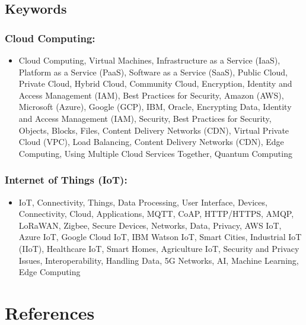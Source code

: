 \documentclass[
  letterpaper,
  DIV=11,
  numbers=noendperiod]{scrreprt}
\providecommand{\tightlist}{%
  \setlength{\itemsep}{0pt}\setlength{\parskip}{0pt}}\usepackage{longtable,booktabs,array}
\begin{document}
\section{Keywords}\label{keywords-1}

\subsection{Cloud Computing:}\label{cloud-computing-3}

\begin{itemize}
\tightlist
\item
  Cloud Computing, Virtual Machines, Infrastructure as a Service (IaaS),
  Platform as a Service (PaaS), Software as a Service (SaaS), Public
  Cloud, Private Cloud, Hybrid Cloud, Community Cloud, Encryption,
  Identity and Access Management (IAM), Best Practices for Security,
  Amazon (AWS), Microsoft (Azure), Google (GCP), IBM, Oracle, Encrypting
  Data, Identity and Access Management (IAM), Security, Best Practices
  for Security, Objects, Blocks, Files, Content Delivery Networks (CDN),
  Virtual Private Cloud (VPC), Load Balancing, Content Delivery Networks
  (CDN), Edge Computing, Using Multiple Cloud Services Together, Quantum
  Computing
\end{itemize}

\subsection{Internet of Things (IoT):}\label{internet-of-things-iot-2}

\begin{itemize}
\tightlist
\item
  IoT, Connectivity, Things, Data Processing, User Interface, Devices,
  Connectivity, Cloud, Applications, MQTT, CoAP, HTTP/HTTPS, AMQP,
  LoRaWAN, Zigbee, Secure Devices, Networks, Data, Privacy, AWS IoT,
  Azure IoT, Google Cloud IoT, IBM Watson IoT, Smart Cities, Industrial
  IoT (IIoT), Healthcare IoT, Smart Homes, Agriculture IoT, Security and
  Privacy Issues, Interoperability, Handling Data, 5G Networks, AI,
  Machine Learning, Edge Computing
\end{itemize}


\chapter*{References}\label{references-5}
\end{document}
